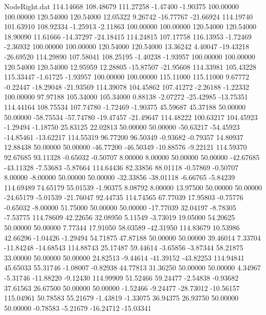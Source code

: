 \begin{filecontents}{NodeRight.dat}
 114.14668  108.48679  111.27258    -1.47400   -1.90375  100.00000  100.00000  120.54000  120.54000   12.05322    9.26742  -16.77767  -21.66924
 114.19740  101.63910  108.92334    -1.25913   -2.11863  100.00000  100.00000  120.54000  120.54000   18.90090   11.61666  -14.37297  -24.18415
 114.24815  107.17758  116.13953    -1.72469   -2.36932  100.00000  100.00000  120.54000  120.54000   13.36242    4.40047  -19.43218  -26.69520
 114.29890  107.58041  108.25195    -1.40238   -1.93957  100.00000  100.00000  120.54000  120.54000   12.95959   12.28805  -15.87507  -21.95608
 114.33981  105.43228  115.33447    -1.61725   -1.93957  100.00000  100.00000  115.11000  115.11000    9.67772   -0.22447  -18.29048  -21.93569
 114.39078  104.45862  107.41272    -2.26188   -1.22332  100.00000   97.97188  105.34000  105.34000    0.88138   -2.07272  -25.42985  -13.75351
 114.44164  108.75534  107.74780    -1.72469   -1.90375   45.59687   45.37188   50.00000   50.00000  -58.75534  -57.74780  -19.47457  -21.49647
 114.48222  100.63217  104.45923    -1.29494   -1.18750   25.83125   22.02813   50.00000   50.00000  -50.63217  -54.45923  -14.85461  -13.62217
 114.55319   96.77200   96.50349    -0.93682   -0.79357   14.80937   12.88438   50.00000   50.00000  -46.77200  -46.50349  -10.88576   -9.22121
 114.59370   92.67685   93.11328    -0.65032   -0.50707    8.00000    8.00000   50.00000   50.00000  -42.67685  -43.11328   -7.53683   -5.87664
 114.64436   82.33856   88.01118    -0.57869   -0.50707    8.00000   -8.00000   50.00000   50.00000  -32.33856  -38.01118   -6.66765   -5.84239
 114.69489   74.65179   55.01539    -1.90375    8.08792    8.00000   13.97500   50.00000   50.00000  -24.65179   -5.01539  -21.76047   92.44735
 114.74565   67.77039   17.95803    -0.75776   -0.65032   -8.00000   51.75000   50.00000   50.00000  -17.77039   32.04197   -8.78305   -7.53775
 114.78609   42.22656   32.08950     5.11549   -3.73019   19.05000   54.20625   50.00000   50.00000    7.77344   17.91050   58.03589  -42.31950
 114.83679   10.53986   42.66296    -1.04426   -1.29494   54.71875   47.87188   50.00000   50.00000   39.46014    7.33704  -11.84248  -14.68543
 114.88743   25.17487   59.44614    -3.65856   -3.87344   58.21875   33.00000   50.00000   50.00000   24.82513   -9.44614  -41.39152  -43.82253
 114.94841   45.65033   55.31746    -1.08007   -0.82938   44.77813   31.36250   50.00000   50.00000    4.34967   -5.31746  -11.88220   -9.12430
 114.99909   51.52466   59.24477    -2.54838   -0.93682   37.61563   26.67500   50.00000   50.00000   -1.52466   -9.24477  -28.73012  -10.56157
 115.04961   50.78583   55.21679    -1.43819   -1.33075   36.94375   26.93750   50.00000   50.00000   -0.78583   -5.21679  -16.24712  -15.03341

\end{filecontents}
